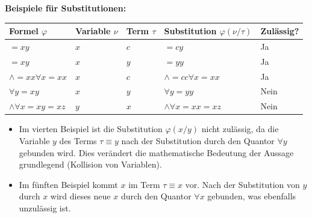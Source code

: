 \begin{math-stroke}
\textbf{Beispiele für Substitutionen:}
\begin{center}
\begin{tabular}{lllll}
\toprule
\textbf{Formel $\varphi$} & \textbf{Variable $\nu$} & \textbf{Term $\tau$} & \textbf{Substitution $\varphi(\nu/\tau)$} & \textbf{Zulässig?} \\ \midrule
$= x y$ & $x$ & $c$ & $= c y$ & Ja \\
$= x y$ & $x$ & $y$ & $= y y$ & Ja \\
$\wedge = x x \forall x = x x$ & $x$ & $c$ & $\wedge = c c \forall x = x x$ & Ja \\
$\forall y = x y$ & $x$ & $y$ & $\forall y = y y$ & Nein \\
$\wedge \forall x = x y = x z$ & $y$ & $x$ & $\wedge \forall x = x x = x z$ & Nein \\
\bottomrule
\end{tabular}
\end{center}

\begin{explanation-of-steps}
\begin{itemize}
    \item Im vierten Beispiel ist die Substitution $\varphi(x/y)$ nicht zulässig, da die Variable $y$ des Terms $\tau \equiv y$ nach der Substitution durch den Quantor $\forall y$ gebunden wird. Dies verändert die mathematische Bedeutung der Aussage grundlegend (Kollision von Variablen).
    \item Im fünften Beispiel kommt $x$ im Term $\tau \equiv x$ vor. Nach der Substitution von $y$ durch $x$ wird dieses neue $x$ durch den Quantor $\forall x$ gebunden, was ebenfalls unzulässig ist.
\end{itemize}
\end{explanation-of-steps}
\end{math-stroke}

\begin{ai-global-state-checkpoint-invisible-content}
\end{ai-global-state-checkpoint-invisible-content}

